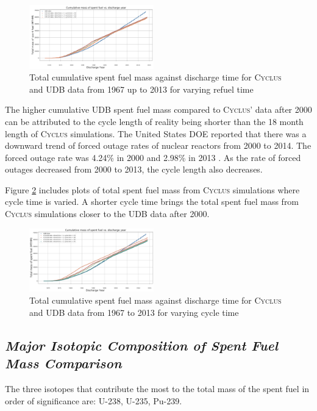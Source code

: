 \documentclass{anstrans}
\newcommand{\Cyclus}{\textsc{Cyclus}\xspace}%
\begin{document}
\begin{figure}[h] 
	\centering
	\includegraphics[width=0.48\textwidth]{total_cumulative_mass_spent_fuel_refueltime}
	\caption{Total cumulative spent fuel mass against discharge time for \Cyclus and UDB data from 1967 up to 2013 for varying refuel time}
	\label{fig:total_refueltime}
\end{figure} 

The higher cumulative UDB spent fuel mass compared to \Cyclus' data after 2000 can be attributed to the cycle length of reality being shorter than the 18 month length of \Cyclus simulations. The United States DOE reported that there was a downward trend of forced outage rates of nuclear reactors from 2000 to 2014. The forced outage rate was 4.24\% in 2000 and 2.98\% in 2013 \cite{gehin_nuclear_2016}. As the rate of forced outages decreased from 2000 to 2013, the cycle length also decreases. 

Figure \ref{fig:total_cycletime} includes plots of total spent fuel mass from \Cyclus simulations where cycle time is varied. A shorter cycle time brings the total spent fuel mass from \Cyclus simulations closer to the UDB data after 2000. 

\begin{figure}[h] %
	\centering
	\includegraphics[width=0.48\textwidth]{total_cumulative_mass_spent_fuel_cycletime}
	\caption{Total cumulative spent fuel mass against discharge time for \Cyclus and UDB data from 1967 to 2013 for varying cycle time}
	\label{fig:total_cycletime}
\end{figure} 

\subsection{\textit{Major Isotopic Composition of  Spent Fuel Mass Comparison}}
The three isotopes that contribute the most to the total mass of the spent fuel in order of significance are: U-238, U-235, Pu-239.  
\end{document}
